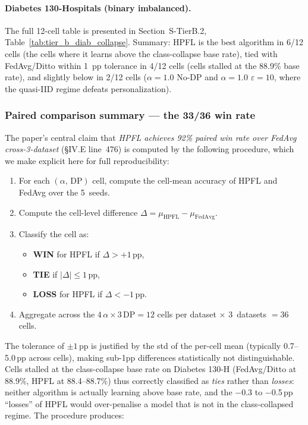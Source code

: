 \documentclass[conference]{IEEEtran}
\begin{document}
\paragraph{Diabetes 130-Hospitals (binary imbalanced).} The full 12-cell table is presented in Section~S-TierB.2, Table~\ref{tab:tier_b_diab_collapse}. Summary: HPFL is the best algorithm in 6/12 cells (the cells where it learns above the class-collapse base rate), tied with FedAvg/Ditto within 1~pp tolerance in 4/12 cells (cells stalled at the 88.9\% base rate), and slightly below in 2/12 cells ($\alpha{=}1.0$ No-DP and $\alpha{=}1.0$ $\varepsilon{=}10$, where the quasi-IID regime defeats personalization).

\subsubsection*{Paired comparison summary --- the 33/36 win rate}

The paper's central claim that \emph{HPFL achieves 92\% paired win rate over FedAvg cross-3-dataset} (§IV.E line~476) is computed by the following procedure, which we make explicit here for full reproducibility:

\begin{enumerate}
\item For each $(\alpha,\,\text{DP})$ cell, compute the cell-mean accuracy of HPFL and FedAvg over the 5~seeds.
\item Compute the cell-level difference $\Delta = \mu_{\text{HPFL}} - \mu_{\text{FedAvg}}$.
\item Classify the cell as:
\begin{itemize}
\item \textbf{WIN} for HPFL if $\Delta > +1$\,pp,
\item \textbf{TIE} if $|\Delta| \leq 1$\,pp,
\item \textbf{LOSS} for HPFL if $\Delta < -1$\,pp.
\end{itemize}
\item Aggregate across the $4\,\alpha \times 3\,\text{DP} = 12$ cells per dataset $\times$ 3~datasets $= 36$ cells.
\end{enumerate}

\noindent The tolerance of $\pm 1$\,pp is justified by the std of the per-cell mean (typically 0.7--5.0\,pp across cells), making sub-1pp differences statistically not distinguishable. Cells stalled at the class-collapse base rate on Diabetes 130-H (FedAvg/Ditto at 88.9\%, HPFL at 88.4--88.7\%) thus correctly classified as \emph{ties} rather than \emph{losses}: neither algorithm is actually learning above base rate, and the $-$0.3 to $-$0.5\,pp ``losses'' of HPFL would over-penalise a model that is not in the class-collapsed regime. The procedure produces:
\end{document}
